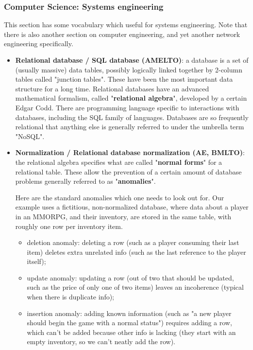 \documentclass{article}
\begin{document}
\subsubsection*{Computer Science: Systems engineering}

This section has some vocabulary which useful for systems engineering. Note that there is also another section on computer engineering, and yet another network engineering specifically. 

\begin{itemize}

	\item \textbf{Relational database / SQL database (AMELTO)}: a database is a set of (usually massive) data tables, possibly logically linked together by 2-column tables called "junction tables". These have been the most important data structure for a long time. Relational databases have an advanced mathematical formalism, called "\textbf{relational algebra}", developed by a certain Edgar Codd. There are programming language specific to interactions with databases, including the SQL family of languages. Databases are so frequently relational that anything else is generally referred to under the umbrella term "NoSQL".

	\item \textbf{Normalization / Relational database normalization (AE, BMLTO)}: the relational algebra specifies what are called "\textbf{normal forms}" for a relational table. These allow the prevention of a certain amount of database problems generally referred to as "\textbf{anomalies}".

	Here are the standard anomalies which one needs to look out for. Our example uses a fictitious, non-normalized database, where data about a player in an MMORPG, and their inventory, are stored in the same table, with roughly one row per inventory item.  
	\begin{itemize}
		\item deletion anomaly: deleting a row (such as a player consuming their last item) deletes extra unrelated info (such as the last reference to the player itself);
		\item update anomaly: updating a row (out of two that should be updated, such as the price of only one of two items) leaves an incoherence (typical when there is duplicate info);
		\item insertion anomaly: adding known information (such as "a new player should begin the game with a normal status") requires adding a row, which can't be added because other info is lacking (they start with an empty inventory, so we can't neatly add the row).
	\end{itemize}


\end{itemize}
\end{document}
